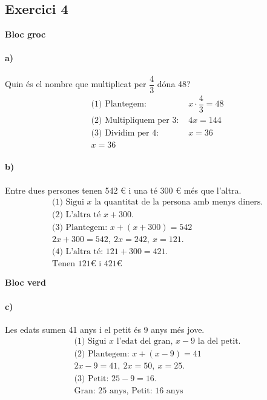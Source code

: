 \documentclass[11pt,a4paper]{article}
\begin{document}
\subsection*{Exercici 4}

\textbf{Bloc groc}

\paragraph{a)} Quin és el nombre que multiplicat per $\dfrac{4}{3}$ dóna 48?
\[
\begin{aligned}
\text{(1) Plantegem: } & x \cdot \dfrac{4}{3} = 48 \\
\text{(2) Multipliquem per 3: } & 4x = 144 \\
\text{(3) Dividim per 4: } & x = 36 \\
\boxed{x = 36}
\end{aligned}
\]

\paragraph{b)} Entre dues persones tenen 542 € i una té 300 € més que l’altra.
\[
\begin{aligned}
\text{(1) Sigui } x \text{ la quantitat de la persona amb menys diners.} \\
\text{(2) L’altra té } x + 300. \\
\text{(3) Plantegem: } x + (x + 300) = 542 \\
2x + 300 = 542,\ 2x = 242,\ x = 121. \\
\text{(4) L’altra té: } 121 + 300 = 421. \\
\boxed{\text{Tenen } 121 € \text{ i } 421 €}
\end{aligned}
\]

\textbf{Bloc verd}

\paragraph{c)} Les edats sumen 41 anys i el petit és 9 anys més jove.
\[
\begin{aligned}
\text{(1) Sigui } x \text{ l’edat del gran, } x - 9 \text{ la del petit.} \\
\text{(2) Plantegem: } x + (x - 9) = 41 \\
2x - 9 = 41,\ 2x = 50,\ x = 25. \\
\text{(3) Petit: } 25 - 9 = 16. \\
\boxed{\text{Gran: 25 anys, Petit: 16 anys}}
\end{aligned}
\]
\end{document}
